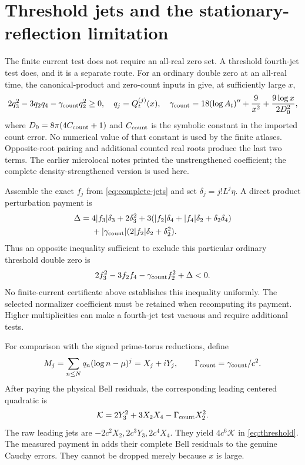 \documentclass[11pt]{article}
\numberwithin{equation}{section}
\theoremstyle{definition}
\theoremstyle{remark}
\begin{document}
\section{Threshold jets and the stationary-reflection limitation}
\label{sec:threshold}
The finite current test does not require an all-real zero set. A
threshold fourth-jet test does, and it is a separate route.
For an ordinary double zero at an all-real time, the canonical-product
and zero-count inputs in \cite{torus,threshold} give, at sufficiently
large $x$,
\begin{equation}
 2q_3^2-3q_2q_4-\gamma_{\rm count}q_2^2\ge0,
 \quad q_j=Q_t^{(j)}(x),\quad
 \gamma_{\rm count}=18(\log A_t)''+\frac9{x^2}
                              +\frac{9\log x}{2D_0^2},
 \label{eq:threshold}
\end{equation}
where $D_0=8\pi(4C_{\rm count}+1)$ and $C_{\rm count}$ is the
symbolic constant in the imported count error. No numerical value of
that constant is used by the finite atlases. Opposite-root pairing
and additional counted real roots produce the last two terms.
The earlier microlocal notes printed the unstrengthened coefficient;
the complete density-strengthened version is used here.

Assemble the exact $f_j$ from \eqref{eq:complete-jets} and set
$\delta_j=j!L^j\eta$. A direct product perturbation payment is
\begin{align}
 \Delta={}&4|f_3|\delta_3+2\delta_3^2
    +3(|f_2|\delta_4+|f_4|\delta_2+\delta_2\delta_4)\nonumber\\
 &+|\gamma_{\rm count}|(2|f_2|\delta_2+\delta_2^2).
 \label{eq:threshold-payment}
\end{align}
Thus an opposite inequality sufficient to exclude this particular
ordinary threshold double zero is
\begin{equation}
 2f_3^2-3f_2f_4-\gamma_{\rm count}f_2^2+\Delta<0.
 \label{eq:open-raw}
\end{equation}
No finite-current certificate above establishes this inequality
uniformly. The selected normalizer coefficient must be retained
when recomputing its payment. Higher multiplicities can make a
fourth-jet test vacuous and require additional tests.

For comparison with the signed prime-torus reductions, define
\[
 M_j=\sum_{n\le N}q_n(\log n-\mu)^j=X_j+iY_j,
 \qquad \Gamma_{\rm count}=\gamma_{\rm count}/c^2.
\]
After paying the physical Bell residuals, the corresponding leading
centered quadratic is
\begin{equation}
 \mathcal K=2Y_3^2+3X_2X_4-\Gamma_{\rm count}X_2^2.
 \label{eq:centered-K}
\end{equation}
The raw leading jets are $-2c^2X_2,2c^3Y_3,2c^4X_4$.
They yield $4c^6\mathcal K$ in \eqref{eq:threshold}.
The measured payment in \cite{torus} adds their complete Bell
residuals to the genuine Cauchy errors. They cannot be dropped
merely because $x$ is large.
\end{document}
